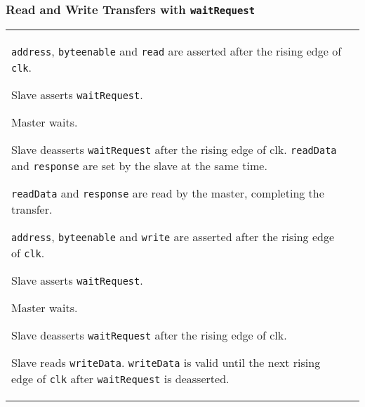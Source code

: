		\subsubsection{Read and Write Transfers with \texttt{waitRequest}  }	
			\begin{tabular}{p{0.475\textwidth}p{}}
				\begin{compactenum}
					\item \texttt{address}, \texttt{byteenable} and \texttt{read} are asserted after the rising edge of \texttt{clk}.
					\item Slave asserts \texttt{waitRequest}.
					\item Master waits.
					\item Slave deasserts \texttt{waitRequest} after the rising edge of clk. \texttt{readData} and \texttt{response} are set by the slave at the same time.
					\item \texttt{readData} and \texttt{response} are read by the master, completing the transfer.
					  
					\item \texttt{address}, \texttt{byteenable} and \texttt{write} are asserted after the rising edge of \texttt{clk}.
					\item Slave asserts \texttt{waitRequest}.
					\item Master waits.
					\item Slave deasserts \texttt{waitRequest} after the rising edge of clk.
					\item Slave reads \texttt{writeData}. \texttt{writeData} is valid until the next rising edge of \texttt{clk} after \texttt{waitRequest} is deasserted.
				\end{compactenum}
					& \vspace{0pt}
					

\end{tabular}
